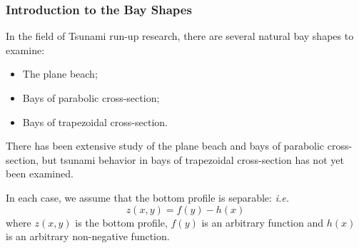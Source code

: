 
	\begin{frame}
		\frametitle{Introduction to the Bay Shapes}
		In the field of Tsunami run-up research, there are several natural bay shapes to examine:
		\begin{itemize}
			\item The plane beach;
			\item Bays of parabolic cross-section;
			\item Bays of trapezoidal cross-section.
		\end{itemize}
		There has been extensive study of the plane beach and bays of parabolic cross-section, but tsunami behavior in bays of trapezoidal cross-section has not yet been examined.
		
		In each case, we assume that the bottom profile is separable: \emph{i.e.}
		\[   z(x,y) = f(y) - h(x)  \]
		where $z(x,y)$ is the bottom profile, $f(y)$ is an arbitrary function and $h(x)$ is an arbitrary non-negative function.
	\end{frame}


